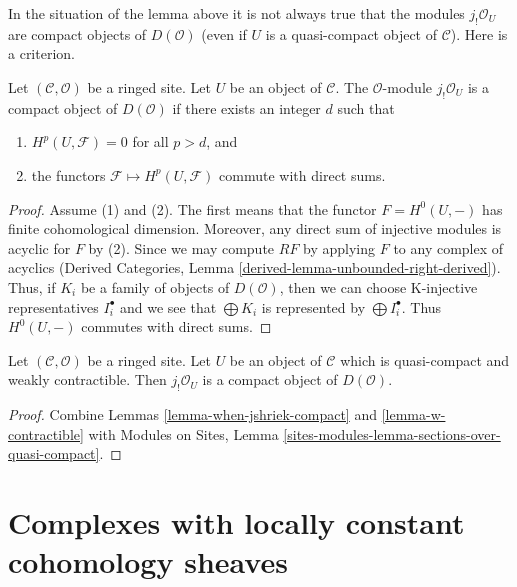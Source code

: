 \noindent
In the situation of the lemma above it is not always true that the
modules $j_!\mathcal{O}_U$ are compact objects of $D(\mathcal{O})$
(even if $U$ is a quasi-compact object of $\mathcal{C}$).
Here is a criterion.

\begin{lemma}
\label{lemma-when-jshriek-compact}
Let $(\mathcal{C}, \mathcal{O})$ be a ringed site. Let $U$ be an object of
$\mathcal{C}$. The $\mathcal{O}$-module
$j_!\mathcal{O}_U$ is a compact object of $D(\mathcal{O})$ if
there exists an integer $d$ such that
\begin{enumerate}
\item $H^p(U, \mathcal{F}) = 0$ for all $p > d$, and
\item the functors $\mathcal{F} \mapsto H^p(U, \mathcal{F})$
commute with direct sums.
\end{enumerate}
\end{lemma}

\begin{proof}
Assume (1) and (2). The first means that the functor $F = H^0(U, -)$ has
finite cohomological dimension. Moreover, any direct sum of injective
modules is acyclic for $F$ by (2). Since we may compute $RF$ by
applying $F$ to any complex of acyclics
(Derived Categories, Lemma \ref{derived-lemma-unbounded-right-derived}).
Thus, if $K_i$ be a family of objects of $D(\mathcal{O})$,
then we can choose K-injective representatives $I_i^\bullet$
and we see that $\bigoplus K_i$ is represented by $\bigoplus I_i^\bullet$.
Thus $H^0(U, -)$ commutes with direct sums.
\end{proof}

\begin{lemma}
\label{lemma-quasi-compact-weakly-contractible-compact}
Let $(\mathcal{C}, \mathcal{O})$ be a ringed site. Let $U$
be an object of $\mathcal{C}$ which is quasi-compact and
weakly contractible. Then
$j_!\mathcal{O}_U$ is a compact object of $D(\mathcal{O})$.
\end{lemma}

\begin{proof}
Combine Lemmas \ref{lemma-when-jshriek-compact} and
\ref{lemma-w-contractible} with
Modules on Sites, Lemma \ref{sites-modules-lemma-sections-over-quasi-compact}.
\end{proof}






\section{Complexes with locally constant cohomology sheaves}
\label{section-locally-constant}

